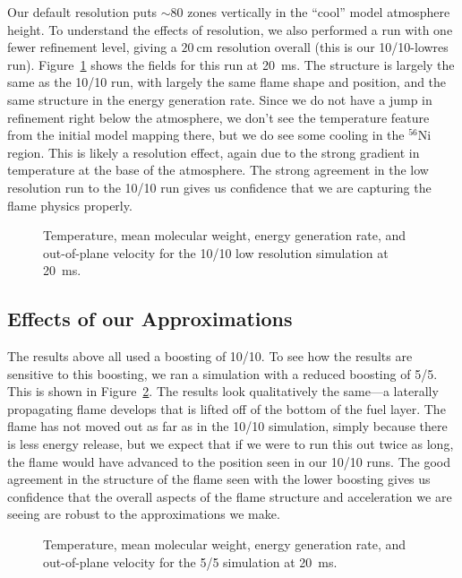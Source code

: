 \documentclass[preprint,times,tighten]{aastex63}
\newcommand{\isot}[2]{$^{#2}\mathrm{#1}$}
\newcommand{\MarginPar}[1]{
    \marginpar{\vskip-\baselineskip%
               \raggedright%
               \tiny\sffamily%
               {\color{red}\hrule%
               \smallskip%
               #1\par%
               \smallskip%
               \hrule}}%
}
\begin{document}
Our default resolution puts $\sim 80$ zones vertically in the
``cool'' \MarginPar{double check} model atmosphere height.  To
understand the effects of resolution, we also performed a run with one
fewer refinement level, giving a $20~\mbox{cm}$ resolution overall (this is our
10/10-lowres run).  Figure~\ref{fig:10_10_lowres} shows the fields for this run at
20~ms.  The structure is largely the same as the 10/10 run, with
largely the same flame shape and position, and the same structure in
the energy generation rate.  Since we do not have a jump in refinement
right below the atmosphere, we don't see the temperature feature from
the initial model mapping there, but we do see some cooling in the
\isot{Ni}{56} region.  This is likely a resolution effect, again due
to the strong gradient in temperature at the base of the atmosphere.
The strong agreement in the low resolution run to the 10/10 run gives
us confidence that we are capturing the flame physics properly.

\begin{figure}[t]
\centering
{}
\caption{\label{fig:10_10_lowres} Temperature, mean molecular weight,
  energy generation rate, and out-of-plane velocity for the 10/10 low
  resolution simulation at 20~ms.}
\end{figure}




\subsection{Effects of our Approximations}

The results above all used a boosting of 10/10.  To see how the
results are sensitive to this boosting, we ran a simulation with a reduced
boosting of 5/5.  This is shown in Figure~\ref{fig:5_5_overview}.  The
results look qualitatively the same---a laterally propagating flame
develops that is lifted off of the bottom of the fuel layer.  The
flame has not moved out as far as in the 10/10 simulation, simply
because there is less energy release, but we expect that if we were to
run this out twice as long, the flame would have advanced to the
position seen in our 10/10 runs.  The good agreement in the structure
of the flame seen with the lower boosting gives us confidence that the
overall aspects of the flame structure and acceleration we are seeing
are robust to the approximations we make.

\begin{figure}[t]
\centering
{}
\caption{\label{fig:5_5_overview} Temperature, mean molecular weight, energy generation rate, and out-of-plane velocity for the 5/5 simulation at 20~ms.}
\end{figure}
\end{document}
